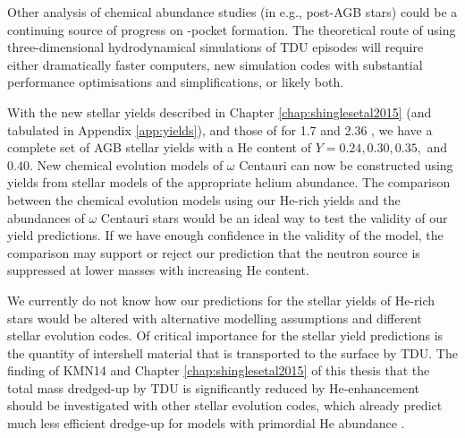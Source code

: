 Other analysis of chemical abundance studies (in e.g., post-AGB stars) could be a continuing source of progress on -pocket formation. The theoretical route of using three-dimensional hydrodynamical simulations of TDU episodes will require either dramatically faster computers, new simulation codes with substantial performance optimisations and simplifications, or likely both.


With the new stellar yields described in Chapter \ref{chap:shinglesetal2015} (and tabulated in Appendix \ref{app:yields}), and those of \citet{Karakas:2014ja} for 1.7 and 2.36 \Msun, we have a complete set of AGB stellar yields with a He content of $Y=0.24,0.30,0.35,$ and $0.40$. New chemical evolution models of $\omega$ Centauri can now be constructed using yields from stellar models of the appropriate helium abundance. The comparison between the chemical evolution models using our He-rich yields and the abundances of $\omega$ Centauri stars would be an ideal way to test the validity of our yield predictions. If we have enough confidence in the validity of the model, the comparison may support or reject our prediction that the  neutron source is suppressed at lower masses with increasing He content.

We currently do not know how our predictions for the stellar yields of He-rich stars would be altered with alternative modelling assumptions and different stellar evolution codes. Of critical importance for the stellar yield predictions is the quantity of intershell material that is transported to the surface by TDU. The finding of KMN14 and Chapter \ref{chap:shinglesetal2015} of this thesis that the total mass dredged-up by TDU is significantly reduced by He-enhancement should be investigated with other stellar evolution codes, which already predict much less efficient dredge-up for models with primordial He abundance \citep[see e.g.,][]{Mowlavi:1999ul,Lugaro:2003ew,Lugaro:2012ht}.

